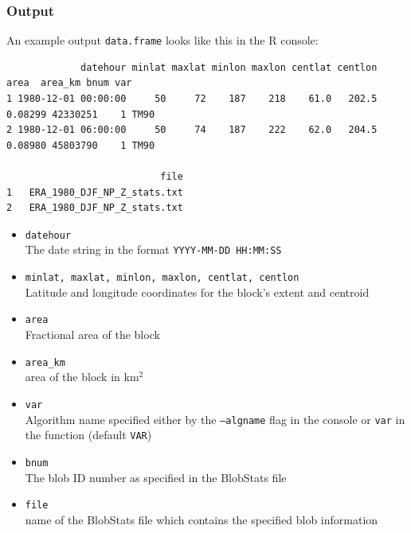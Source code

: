 \documentclass{article}
\begin{document}
\subsubsection{Output}\label{tableoutput}

An example output \texttt{data.frame} looks like this in the R console:
\begin{verbatim}
             datehour minlat maxlat minlon maxlon centlat centlon    area  area_km bnum var
1 1980-12-01 00:00:00     50     72    187    218    61.0   202.5 0.08299 42330251    1 TM90
2 1980-12-01 06:00:00     50     74    187    222    62.0   204.5 0.08980 45803790    1 TM90

                           file
1   ERA_1980_DJF_NP_Z_stats.txt
2   ERA_1980_DJF_NP_Z_stats.txt
\end{verbatim}

\begin{itemize}
\item[]\texttt{datehour}\\The date string in the format \texttt{YYYY-MM-DD HH:MM:SS}
\item[] \texttt{minlat, maxlat, minlon, maxlon, centlat, centlon}\\ Latitude and longitude coordinates for the block's extent and centroid
\item[] \texttt{area}\\ Fractional area of the block
\item[] \texttt{area\_km}\\area of the block in km$^2$
\item[] \texttt{var}\\ Algorithm name specified either by the \texttt{--algname} flag in the console or \texttt{var} in the function (default \texttt{VAR})
\item[] \texttt{bnum} \\The blob ID number as specified in the BlobStats file
\item[] \texttt{file} \\name of the BlobStats file which contains the specified blob information
\end{itemize}
\end{document}
